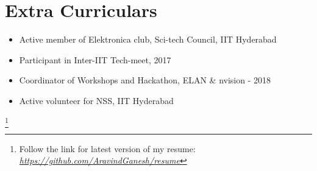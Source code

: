 \documentclass[11pt]{article} %
\newcommand\blfootnote[1]{%
  \begingroup
  \renewcommand\thefootnote{}\footnote{#1}%
  \addtocounter{footnote}{-1}%
  \endgroup
}
\begin{document}


\hline

\section{Extra Curriculars}
\begin{itemize}
    \item Active member of Elektronica club, Sci-tech Council, IIT Hyderabad
    \item Participant in Inter-IIT Tech-meet, 2017
    \item Coordinator of Workshops and Hackathon, ELAN \& nvision - 2018
    \item Active volunteer for NSS, IIT Hyderabad
\end{itemize}

\blfootnote{Follow the link for latest version of my resume:  \href{https://github.com/AravindGanesh/resume}{\textit{https://github.com/AravindGanesh/resume}} }
\end{document}
